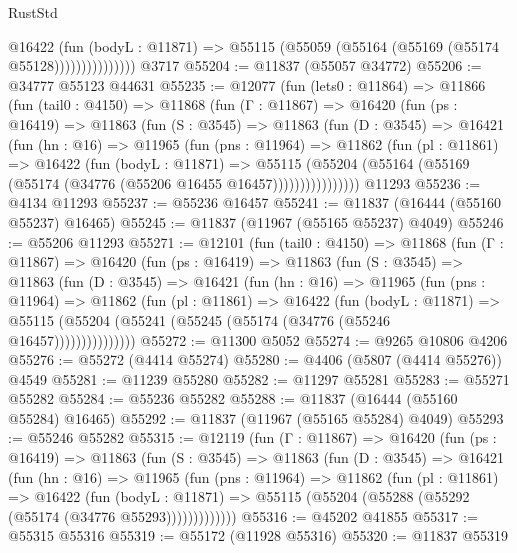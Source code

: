 \begin{lexlean}{RustStd}
\begin{coremodule}
                      @16422
                        (fun (bodyL : @11871) =>
                        @55115 (@55059 (@55164 (@55169 (@55174 @55128)))))))))))))))
    @3717
@55204 := @11837 (@55057 @34772)
@55206 := @34777 @55123 @44631
@55235 := @12077
    (fun (lets0 : @11864) =>
    @11866
      (fun (tail0 : @4150) =>
      @11868
        (fun (Γ : @11867) =>
        @16420
          (fun (ps : @16419) =>
          @11863
            (fun (S : @3545) =>
            @11863
              (fun (D : @3545) =>
              @16421
                (fun (hn : @16) =>
                @11965
                  (fun (pns : @11964) =>
                  @11862
                    (fun (pl : @11861) =>
                    @16422
                      (fun (bodyL : @11871) =>
                      @55115
                        (@55204
                          (@55164 (@55169 (@55174 (@34776 (@55206 @16455 @16457))))))))))))))))
    @11293
@55236 := @4134 @11293
@55237 := @55236 @16457
@55241 := @11837 (@16444 (@55160 @55237) @16465)
@55245 := @11837 (@11967 (@55165 @55237) @4049)
@55246 := @55206 @11293
@55271 := @12101
    (fun (tail0 : @4150) =>
    @11868
      (fun (Γ : @11867) =>
      @16420
        (fun (ps : @16419) =>
        @11863
          (fun (S : @3545) =>
          @11863
            (fun (D : @3545) =>
            @16421
              (fun (hn : @16) =>
              @11965
                (fun (pns : @11964) =>
                @11862
                  (fun (pl : @11861) =>
                  @16422
                    (fun (bodyL : @11871) =>
                    @55115 (@55204 (@55241 (@55245 (@55174 (@34776 (@55246 @16457)))))))))))))))
@55272 := @11300 @5052
@55274 := @9265 @10806 @4206
@55276 := @55272 (@4414 @55274)
@55280 := @4406 (@5807 (@4414 @55276)) @4549
@55281 := @11239 @55280
@55282 := @11297 @55281
@55283 := @55271 @55282
@55284 := @55236 @55282
@55288 := @11837 (@16444 (@55160 @55284) @16465)
@55292 := @11837 (@11967 (@55165 @55284) @4049)
@55293 := @55246 @55282
@55315 := @12119
    (fun (Γ : @11867) =>
    @16420
      (fun (ps : @16419) =>
      @11863
        (fun (S : @3545) =>
        @11863
          (fun (D : @3545) =>
          @16421
            (fun (hn : @16) =>
            @11965
              (fun (pns : @11964) =>
              @11862
                (fun (pl : @11861) =>
                @16422
                  (fun (bodyL : @11871) =>
                  @55115 (@55204 (@55288 (@55292 (@55174 (@34776 @55293)))))))))))))
@55316 := @45202 @41855
@55317 := @55315 @55316
@55319 := @55172 (@11928 @55316)
@55320 := @11837 @55319

\end{coremodule}
\end{lexlean}
